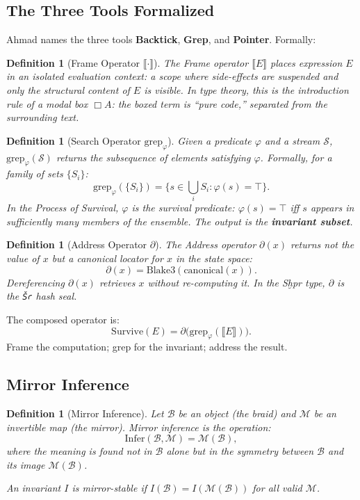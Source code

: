 \documentclass[11pt,letterpaper]{article}
\newtheorem{definition}[theorem]{Definition}
\begin{document}
\subsection{The Three Tools Formalized}

Ahmad names the three tools \textbf{Backtick}, \textbf{Grep}, and
\textbf{Pointer}.  Formally:

\begin{definition}[Frame Operator $\llbracket \cdot \rrbracket$]
The Frame operator $\llbracket E \rrbracket$ places expression $E$ in an
\emph{isolated evaluation context}: a scope where side-effects are suspended
and only the structural content of $E$ is visible.  In type theory, this is
the introduction rule of a modal box $\Box A$: the boxed term is ``pure
code,'' separated from the surrounding text.
\end{definition}

\begin{definition}[Search Operator $\mathrm{grep}_\varphi$]
Given a predicate $\varphi$ and a stream $\mathcal{S}$, $\mathrm{grep}_\varphi(\mathcal{S})$
returns the subsequence of elements satisfying $\varphi$.  Formally, for a
family of sets $\{S_i\}$:
\[
\mathrm{grep}_\varphi(\{S_i\}) = \{s \in \bigcup_i S_i : \varphi(s) = \top\}.
\]
In the Process of Survival, $\varphi$ is the survival predicate: $\varphi(s)
= \top$ iff $s$ appears in sufficiently many members of the ensemble.  The
output is the \textbf{invariant subset}.
\end{definition}

\begin{definition}[Address Operator $\partial$]
The Address operator $\partial(x)$ returns not the value of $x$ but a
\emph{canonical locator} for $x$ in the state space:
\[
\partial(x) = \mathrm{Blake3}(\mathrm{canonical}(x)).
\]
Dereferencing $\partial(x)$ retrieves $x$ without re-computing it.  In the
\textit{Sḫpr} type, $\partial$ is the \texttt{Šꜥ} hash seal.
\end{definition}

The composed operator is:
\[
\mathrm{Survive}(E) = \partial\bigl(\mathrm{grep}_\varphi(\llbracket E \rrbracket)\bigr).
\]
Frame the computation; grep for the invariant; address the result.

\subsection{Mirror Inference}

\begin{definition}[Mirror Inference]
\label{def:mirror}
Let $\mathcal{B}$ be an object (the \emph{braid}) and $\mathcal{M}$ be an
invertible map (the \emph{mirror}).  Mirror inference is the operation:
\[
\mathrm{Infer}(\mathcal{B}, \mathcal{M}) = \mathcal{M}(\mathcal{B}),
\]
where the meaning is found not in $\mathcal{B}$ alone but in the
\emph{symmetry} between $\mathcal{B}$ and its image $\mathcal{M}(\mathcal{B})$.

An invariant $I$ is \emph{mirror-stable} if $I(\mathcal{B}) = I(\mathcal{M}(\mathcal{B}))$
for all valid $\mathcal{M}$.
\end{definition}
\end{document}
